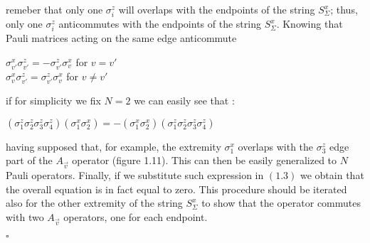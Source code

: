 \documentclass{Configuration_Files/PoliMi3i_thesis}
\begin{document}
remeber that only one $\sigma_i^z$ will overlaps with the endpoints of the string $S^x_\Sigma$; thus, only one $\sigma_i^z$ anticommutes with the endpoints of the string $S^x_\Sigma$. Knowing that Pauli matrices acting on the same edge anticommute

\begin{center}
	$\sigma_{v'}^x \sigma_{v'}^z = - \sigma_{v'}^z \sigma_v^x$ for $v=v'$ \\
	$\sigma_v^x \sigma_{v'}^z =  \sigma_{v'}^z \sigma_v^x$ for $v \neq v'$ 
\end{center}

if for simplicity we fix $N=2$ we can easily see that :

\begin{center}
	$(\sigma_1^z \sigma_2^z \sigma_3^z \sigma_4^z)(\sigma_1^x \sigma_2^x)  = - (\sigma_1^x \sigma_2^x)(\sigma_1^z \sigma_2^z \sigma_3^z \sigma_4^z) $ 
\end{center}

having supposed that, for example, the extremity $\sigma_1^x$ overlaps with the $\sigma_3^z$ edge part of the $A_{\vec{v}} $ operator (figure 1.11). This can then be easily generalized to $N$ Pauli operators. Finally, if we substitute such expression in $(1.3)$ we obtain that the overall equation is in fact equal to zero. \newline
This procedure should be iterated also for the other extremity of the string $S^x_\Sigma$ to show that the operator commutes with two $A_{\vec{v}} $ operators, one for each endpoint.

\hfill $\square$ 
\end{document}
